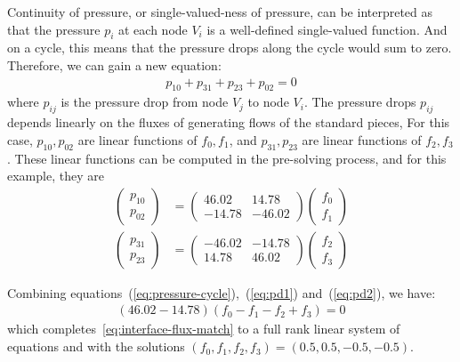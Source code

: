 \documentclass[10pt,twocolumn,letterpaper]{article}
\begin{document}
Continuity of pressure, or single-valued-ness of pressure, 
can be interpreted as that the pressure $p_i$ at each node $V_i$ is 
a well-defined single-valued function.
And on a cycle, this means that 
the pressure drops along the cycle would sum to zero. Therefore, we can gain a new equation: 
\begin{align}
  p_{10} + p_{31} + p_{23} + p_{02} =0 \label{eq:pressure-cycle}
\end{align}
where $p_{ij}$ is the pressure drop from node $V_j$ to node $V_i$. 
The pressure drops $p_{ij}$ depends linearly on the fluxes of generating flows of the standard pieces, 
For this case, $p_{10}, p_{02}$ are linear functions of $f_0,f_1$, 
and $p_{31}, p_{23}$ are linear functions of $f_2,f_3$. 
These linear functions can be computed in the pre-solving process,
and for this example, they are
\begin{align}
  \begin{pmatrix} p_{10} \\ p_{02} \end{pmatrix} 
  &= \begin{pmatrix}
    46.02 & 14.78 \\
    -14.78 & -46.02
  \end{pmatrix}
  \begin{pmatrix}
    f_0\\
    f_1
  \end{pmatrix} \label{eq:pd1} \\
  \begin{pmatrix} p_{31} \\ p_{23} \end{pmatrix} 
  &= \begin{pmatrix}
    -46.02 & -14.78 \\
    14.78 & 46.02
  \end{pmatrix}
  \begin{pmatrix}
    f_2\\
    f_3
  \end{pmatrix}\label{eq:pd2}
\end{align}

Combining equations~(\ref{eq:pressure-cycle}),~(\ref{eq:pd1}) and~(\ref{eq:pd2}), we have:
\begin{align}
  (46.02-14.78)(f_0 - f_1 - f_2 + f_3) = 0
\end{align}
which completes~\eqref{eq:interface-flux-match} to a full rank linear system of equations 
and with the solutions $(f_0,f_1,f_2,f_3) = (0.5,0.5,-0.5,-0.5)$. 
\end{document}
